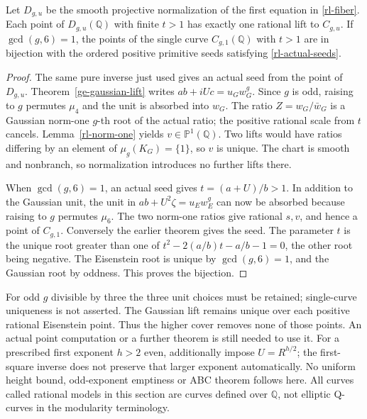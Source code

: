 \begin{theorem}
\label{rl-unique-lift}
Let $D_{g,u}$ be the smooth projective normalization of the first
equation in \eqref{rl-fiber}. Each point of $D_{g,u}(\mathbb Q)$
with finite $t>1$ has exactly one rational lift to $C_{g,u}$.
If $\gcd(g,6)=1$, the points of the single curve
$C_{g,1}(\mathbb Q)$ with $t>1$ are in bijection with the ordered
positive primitive seeds satisfying \eqref{rl-actual-seeds}.
\end{theorem}
\begin{proof}
The same pure inverse just used gives an actual seed from the
point of $D_{g,u}$. Theorem~\ref{ge-gaussian-lift} writes
$ab+iUc=u_Gw_G^g$. Since $g$ is odd, raising to $g$ permutes
$\mu_4$ and the unit is absorbed into $w_G$. The ratio
$Z=w_G/\bar w_G$ is a Gaussian norm-one $g$-th root of the
actual ratio; the positive rational scale from $t$ cancels.
Lemma~\ref{rl-norm-one} yields $v\in\mathbb P^1(\mathbb Q)$.
Two lifts would have ratios differing by an element of
$\mu_g(K_G)=\{1\}$, so $v$ is unique. The chart is smooth and
nonbranch, so normalization introduces no further lifts there.

When $\gcd(g,6)=1$, an actual seed gives
$t=(a+U)/b>1$. In addition to the Gaussian unit, the unit in
$ab+U^2\zeta=u_Ew_E^g$ can now be absorbed because raising to
$g$ permutes $\mu_6$. The two norm-one ratios give rational
$s,v$, and hence a point of $C_{g,1}$. Conversely the earlier
theorem gives the seed. The parameter $t$ is the unique root
greater than one of
$t^2-2(a/b)t-a/b-1=0$, the other root being negative.
The Eisenstein root is unique by $\gcd(g,6)=1$, and the Gaussian
root by oddness. This proves the bijection.
\end{proof}

For odd $g$ divisible by three the three unit choices must be
retained; single-curve uniqueness is not asserted. The Gaussian
lift remains unique over each positive rational Eisenstein point.
Thus the higher cover removes none of those points. An actual
point computation or a further theorem is still needed to use it.
For a prescribed first exponent $h>2$ even, additionally impose
$U=R^{h/2}$; the first-square inverse does not preserve that larger
exponent automatically. No uniform height bound, odd-exponent
emptiness or ABC theorem follows here. All curves called rational
models in this section are curves defined over $\mathbb Q$, not
elliptic Q-curves in the modularity terminology.

